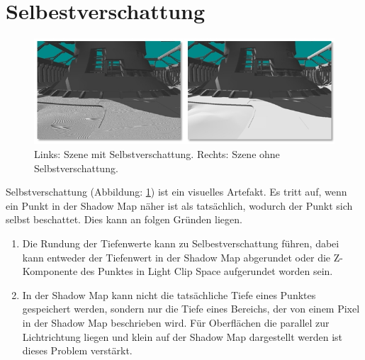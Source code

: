 \section{Selbestverschattung}
\label{section:self-shadow}
\begin{figure}[H]
	\begin{center}
    \includegraphics[width=1\textwidth]{res/img/shadow-acne1/image.jpg}
    \caption{Links\hspace{6}: Szene mit Selbstverschattung. 
         \newline Rechts: Szene ohne Selbstverschattung.
         \newline } 
	\end{center}
	\label{fig:shadow-acne-artefact}
\end{figure}
Selbstverschattung (Abbildung: \ref{fig:shadow-acne-artefact}) ist ein visuelles Artefakt.
Es tritt auf, wenn ein Punkt in der Shadow Map näher ist als tatsächlich, wodurch der Punkt sich selbst beschattet.
Dies kann an folgen Gründen liegen.
\begin{enumerate}
  \item Die Rundung der Tiefenwerte kann zu Selbestverschattung führen, dabei kann entweder der Tiefenwert in der Shadow Map
    abgerundet oder die Z-Komponente des Punktes in Light Clip Space aufgerundet worden sein.
  \item In der Shadow Map kann nicht die tatsächliche Tiefe eines Punktes
    gespeichert werden, sondern nur die Tiefe eines Bereichs, der von einem Pixel in der Shadow Map beschrieben wird.
    Für Oberflächen die parallel zur Lichtrichtung liegen und klein auf der Shadow Map dargestellt werden ist dieses Problem
    verstärkt.
\end{enumerate}


